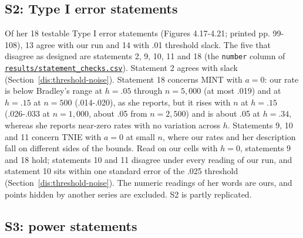 \subsection{S2: Type I error statements}\label{sec:s2}

Of her 18 testable Type I error statements (Figures 4.17-4.21; printed pp. 99-108), 13 agree with our run and 14 with .01 threshold slack. The five that disagree as designed are statements 2, 9, 10, 11 and 18 (the \texttt{number} column of \href{https://github.com/alectionary/vibe-math/blob/master/formalization/chen-rdd-mediation/results/statement_checks.csv}{\nolinkurl{results/statement_checks.csv}}). Statement 2 agrees with slack (Section~\ref{dis:threshold-noise}). Statement 18 concerns MINT with $a = 0$: our rate is below Bradley's range at $h = .05$ through $n = 5{,}000$ (at most .019) and at $h = .15$ at $n = 500$ (.014-.020), as she reports, but it rises with $n$ at $h = .15$ (.026-.033 at $n = 1{,}000$, about .05 from $n = 2{,}500$) and is about .05 at $h = .34$, whereas she reports near-zero rates with no variation across $h$. Statements 9, 10 and 11 concern TNIE with $a = 0$ at small $n$, where our rates and her description fall on different sides of the bounds. Read on our cells with $h = 0$, statements 9 and 18 hold; statements 10 and 11 disagree under every reading of our run, and statement 10 sits within one standard error of the .025 threshold (Section~\ref{dis:threshold-noise}). The numeric readings of her words are ours, and points hidden by another series are excluded. S2 is partly replicated.

\subsection{S3: power statements}\label{sec:s3}

